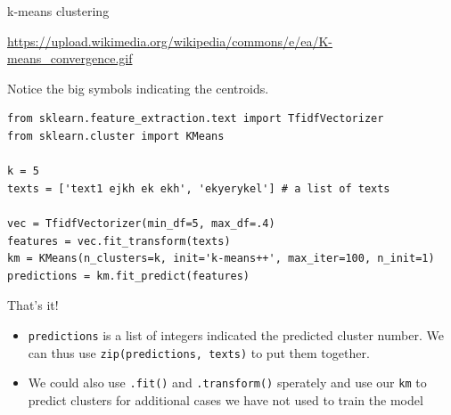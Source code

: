 \documentclass[compress]{beamer}
\begin{document}
\begin{frame}{k-means clustering}

{\tiny{\url{https://upload.wikimedia.org/wikipedia/commons/e/ea/K-means\_convergence.gif}}}

Notice the big symbols indicating the centroids.
\end{frame}


\begin{frame}
\begin{lstlisting}
from sklearn.feature_extraction.text import TfidfVectorizer
from sklearn.cluster import KMeans

k = 5
texts = ['text1 ejkh ek ekh', 'ekyerykel'] # a list of texts

vec = TfidfVectorizer(min_df=5, max_df=.4)
features = vec.fit_transform(texts)
km = KMeans(n_clusters=k, init='k-means++', max_iter=100, n_init=1)
predictions = km.fit_predict(features)

\end{lstlisting}

That's it!
\pause

\begin{itemize}
\item \texttt{predictions} is a list of integers indicated the predicted cluster number. We can thus use \texttt{zip(predictions, texts)} to put them together.
\item<+-> We could also use \texttt{.fit()} and \texttt{.transform()} sperately and use our \texttt{km} to predict clusters for additional cases we have not used to train the model
\end{itemize}

\end{frame}
\end{document}
